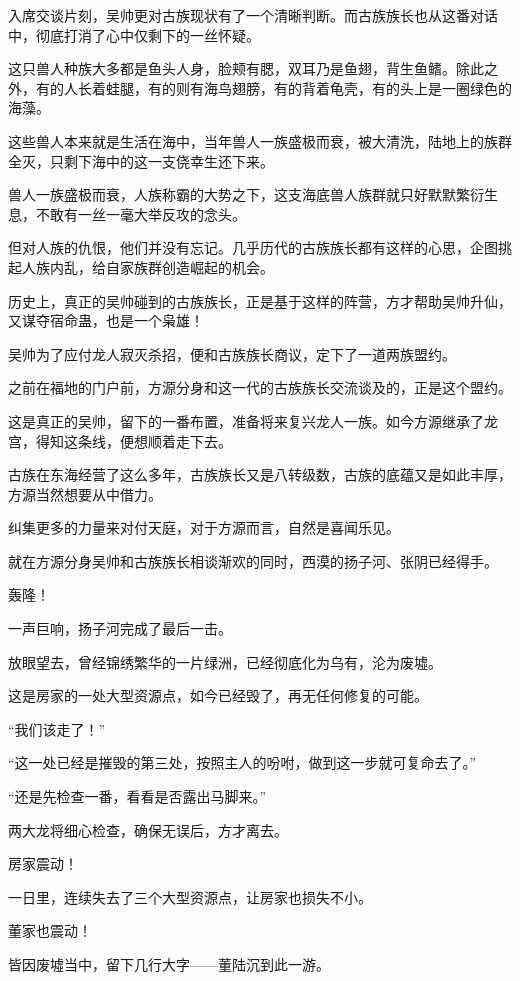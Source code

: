 \begin{this_body}
入席交谈片刻，吴帅更对古族现状有了一个清晰判断。而古族族长也从这番对话中，彻底打消了心中仅剩下的一丝怀疑。

这只兽人种族大多都是鱼头人身，脸颊有腮，双耳乃是鱼翅，背生鱼鳍。除此之外，有的人长着蛙腿，有的则有海鸟翅膀，有的背着龟壳，有的头上是一圈绿色的海藻。

这些兽人本来就是生活在海中，当年兽人一族盛极而衰，被大清洗，陆地上的族群全灭，只剩下海中的这一支侥幸生还下来。

兽人一族盛极而衰，人族称霸的大势之下，这支海底兽人族群就只好默默繁衍生息，不敢有一丝一毫大举反攻的念头。

但对人族的仇恨，他们并没有忘记。几乎历代的古族族长都有这样的心思，企图挑起人族内乱，给自家族群创造崛起的机会。

历史上，真正的吴帅碰到的古族族长，正是基于这样的阵营，方才帮助吴帅升仙，又谋夺宿命蛊，也是一个枭雄！

吴帅为了应付龙人寂灭杀招，便和古族族长商议，定下了一道两族盟约。

之前在福地的门户前，方源分身和这一代的古族族长交流谈及的，正是这个盟约。

这是真正的吴帅，留下的一番布置，准备将来复兴龙人一族。如今方源继承了龙宫，得知这条线，便想顺着走下去。

古族在东海经营了这么多年，古族族长又是八转级数，古族的底蕴又是如此丰厚，方源当然想要从中借力。

纠集更多的力量来对付天庭，对于方源而言，自然是喜闻乐见。

就在方源分身吴帅和古族族长相谈渐欢的同时，西漠的扬子河、张阴已经得手。

轰隆！

一声巨响，扬子河完成了最后一击。

放眼望去，曾经锦绣繁华的一片绿洲，已经彻底化为乌有，沦为废墟。

这是房家的一处大型资源点，如今已经毁了，再无任何修复的可能。

“我们该走了！”

“这一处已经是摧毁的第三处，按照主人的吩咐，做到这一步就可复命去了。”

“还是先检查一番，看看是否露出马脚来。”

两大龙将细心检查，确保无误后，方才离去。

房家震动！

一日里，连续失去了三个大型资源点，让房家也损失不小。

董家也震动！

皆因废墟当中，留下几行大字——董陆沉到此一游。


\end{this_body}
